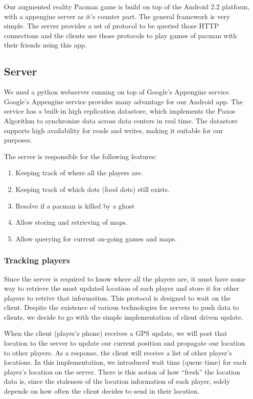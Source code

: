 \documentclass{acm_proc_article-sp}
\begin{document}
Our augmented reality Pacman game is build on top of the Android 2.2
platform, with a appengine server as it's counter part. The general
framework is very simple. The server provides a set of protocol to be
queried those HTTP connections and the clients use those protocols to
play games of pacman with their friends using this app.

\subsection{Server}

We used a python webserver running on top of Google's Appengine
service. Google's Appengine service provides many advantage for our
Android app. The service has a built-in high replication datastore,
which implements the Paxos Algorithm to synchronize data across data
centers in real time. The datastore supports high availability for
reads and writes, making it suitable for our purposes.

The server is responsible for the following features:

\begin{enumerate}
\item Keeping track of where all the players are.
\item Keeping track of which dots (food dots) still exists.
\item Resolve if a pacman is killed by a ghost
\item Allow storing and retrieving of maps.
\item Allow querying for current on-going games and maps.
\end{enumerate}

\subsubsection{Tracking players}
Since the server is required to know where all the players are, it
must have some way to retrieve the most updated location of each
player and store it for other players to retrive that
information. This protocol is designed to wait on the client. Despite
the existence of various technologies for servers to push data to
clients, we decide to go with the simple implementation of client
driven update.

When the client (player's phone) receives a GPS update, we will post
that location to the server to update our current position and
propagate our location to other players. As a response, the client
will receive a list of other player's locations. In this
implementation, we introduced wait time (queue time) for each
player's location on the server. There is this notion of how ``fresh''
the location data is, since the staleness of the location information
of each player, solely depends on how often the client decides to send
in their location. 
\end{document}
